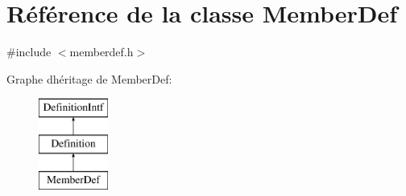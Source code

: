 \hypertarget{class_member_def}{}\section{Référence de la classe Member\+Def}
\label{class_member_def}


{\ttfamily \#include $<$memberdef.\+h$>$}

Graphe d\textquotesingle{}héritage de Member\+Def\+:\begin{figure}[H]
\begin{center}
\leavevmode
\includegraphics[height=3.000000cm]{class_member_def}
\end{center}
\end{figure}
